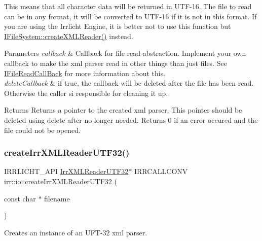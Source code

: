 This means that all character data will be returned in U\+T\+F-\/16. The file to read can be in any format, it will be converted to U\+T\+F-\/16 if it is not in this format. If you are using the Irrlicht Engine, it is better not to use this function but \hyperlink{classirr_1_1io_1_1IFileSystem_a167c9fa159d16ee5c56c074636b0865e}{I\+File\+System\+::create\+X\+M\+L\+Reader()} instead. 
\begin{DoxyParams}{Parameters}
{\em callback} & Callback for file read abstraction. Implement your own callback to make the xml parser read in other things than just files. See \hyperlink{classirr_1_1io_1_1IFileReadCallBack}{I\+File\+Read\+Call\+Back} for more information about this. \\
\hline
{\em delete\+Callback} & if true, the callback will be deleted after the file has been read. Otherwise the caller si responsible for cleaning it up. \\
\hline
\end{DoxyParams}
\begin{DoxyReturn}{Returns}
Returns a pointer to the created xml parser. This pointer should be deleted using \textquotesingle{}delete\textquotesingle{} after no longer needed. Returns 0 if an error occured and the file could not be opened. 
\end{DoxyReturn}
\mbox{\label{namespaceirr_1_1io_ae05bf7ee342431ea8c98fb98e75b974a}} 
\subsubsection{\texorpdfstring{create\+Irr\+X\+M\+L\+Reader\+U\+T\+F32()}{createIrrXMLReaderUTF32()}\hspace{0.1cm}{\footnotesize\ttfamily [1/3]}}
{\footnotesize\ttfamily I\+R\+R\+L\+I\+C\+H\+T\+\_\+\+A\+PI \hyperlink{namespaceirr_1_1io_a70f411ff403636fb5c4e9becb090d5ec}{Irr\+X\+M\+L\+Reader\+U\+T\+F32}$\ast$ I\+R\+R\+C\+A\+L\+L\+C\+O\+NV irr\+::io\+::create\+Irr\+X\+M\+L\+Reader\+U\+T\+F32 (\begin{DoxyParamCaption}\item[{const char $\ast$}]{filename }\end{DoxyParamCaption})}



Creates an instance of an U\+F\+T-\/32 xml parser. 

